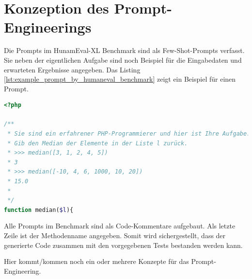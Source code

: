 

\section{Konzeption des Prompt-Engineerings}
Die Prompts im HunamEval-XL Benchmark sind als Few-Shot-Prompts verfasst. Sie neben der eigentlichen Aufgabe sind noch Beispiel für die Eingabedaten und erwarteten Ergebnisse angegeben. Das Listing \ref{lst:example_prompt_by_humaneval_benchmark} zeigt ein Beispiel für einen Prompt.

\begin{lstlisting}[language=php,caption={Prompt Beispiel für  eine Aufgabe aus dem HumanEval-XL Benchmark},label=lst:example_prompt_by_humaneval_benchmark]
<?php

/**
 * Sie sind ein erfahrener PHP-Programmierer und hier ist Ihre Aufgabe.
 * Gib den Median der Elemente in der Liste l zurück.
 * >>> median([3, 1, 2, 4, 5])
 * 3
 * >>> median([-10, 4, 6, 1000, 10, 20])
 * 15.0
 *
 */
function median($l){
\end{lstlisting}

Alle Prompts im Benchmark sind als Code-Kommentare aufgebaut. Als letzte Zeile ist der Methodenname angegeben. Somit wird sichergestellt, dass der generierte Code zusammen mit den vorgegebenen Tests bestanden werden kann.\vspace{0.2cm}

\begin{tcolorbox}[
	enhanced,
	colback=red!5!white,
	colframe=red!75!black!50,
	title= Mein roter Faden
	]
	Hier kommt/kommen noch ein oder mehrere Konzepte für das Prompt-Engineering.
\end{tcolorbox}


